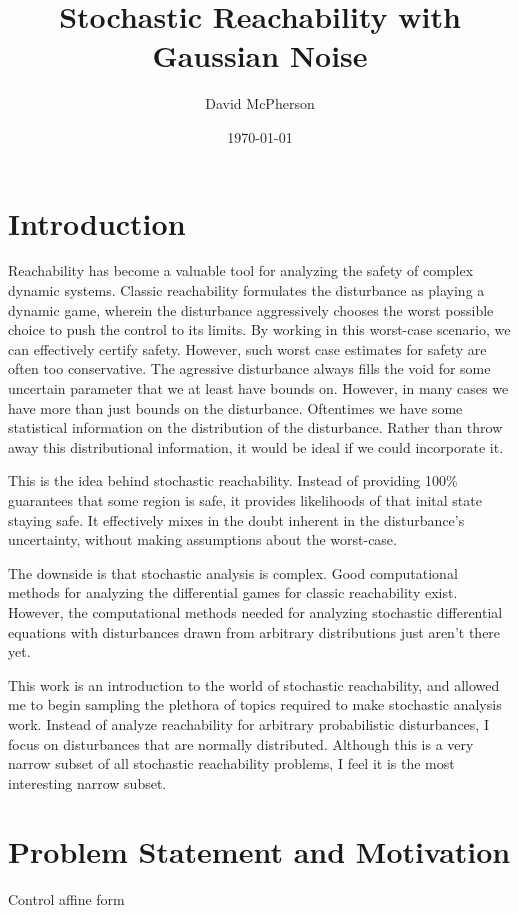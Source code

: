 \documentclass[a4paper]{article}
\title{Stochastic Reachability with Gaussian Noise}
\author{David McPherson}
\date{\today}
\begin{document}
\maketitle

\section{Introduction}
Reachability has become a valuable tool for analyzing the safety of complex dynamic systems.
Classic reachability formulates the disturbance as playing a dynamic game, wherein the disturbance aggressively chooses the worst possible choice to push the control to its limits.
By working in this worst-case scenario, we can effectively certify safety.
However, such worst case estimates for safety are often too conservative.
The agressive disturbance always fills the void for some uncertain parameter that we at least have bounds on.
However, in many cases we have more than just bounds on the disturbance.
Oftentimes we have some statistical information on the distribution of the disturbance.
Rather than throw away this distributional information, it would be ideal if we could incorporate it.

This is the idea behind stochastic reachability.
Instead of providing 100\% guarantees that some region is safe, it provides likelihoods of that inital state staying safe.
It effectively mixes in the doubt inherent in the disturbance's uncertainty, without making assumptions about the worst-case.

The downside is that stochastic analysis is complex.
Good computational methods for analyzing the differential games for classic reachability exist.
However, the computational methods needed for analyzing stochastic differential equations with disturbances drawn from arbitrary distributions just aren't there yet.

This work is an introduction to the world of stochastic reachability, and allowed me to begin sampling the plethora of topics required to make stochastic analysis work.
Instead of analyze reachability for arbitrary probabilistic disturbances, I focus on disturbances that are normally distributed.
Although this is a very narrow subset of all stochastic reachability problems, I feel it is the most interesting narrow subset.

\section{Problem Statement and Motivation}
Control affine form
\end{document}

